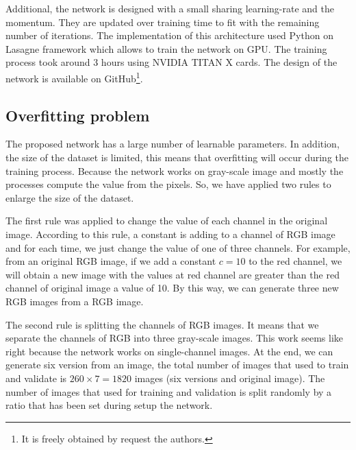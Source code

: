 \documentclass[conference]{IEEEtran}
\begin{document}
Additional, the network is designed with a small sharing learning-rate and the momentum. They are updated over training time to fit with the remaining number of iterations. The implementation of this architecture used Python on Lasagne framework\cite{lasagne} which allows to train the network on GPU. The training process took around 3 hours using NVIDIA TITAN X cards. The design of the network is available on GitHub\footnote{It is freely obtained by request the authors.}.
\subsection{Overfitting problem}
The proposed network has a large number of learnable parameters. In addition, the size of the dataset is limited, this means that overfitting will occur during the training process. Because the network works on  gray-scale image and mostly the processes compute the value from the pixels. So, we have applied two rules to enlarge the size of the dataset.

The first rule was applied to change the value of each channel in the original image. According to this rule, a constant is adding to a channel of RGB image and for each time, we just change the value of one of three channels. For example, from an original RGB image, if we add a constant $c = 10$ to the red channel, we will obtain a new image with the values at red channel are greater than the red channel of original image a value of 10. By this way, we can generate three new RGB images from a RGB image.

The second rule is splitting the channels of RGB images. It means that we separate the channels of RGB into three gray-scale images. This work seems like right because the network works on single-channel images. At the end, we can generate six version from an image, the total number of images that used to train and validate is $260 \times 7 = 1820$ images (six versions and original image). The number of images that used for training and validation is split randomly by a ratio that has been set during setup the network.

\end{document}
